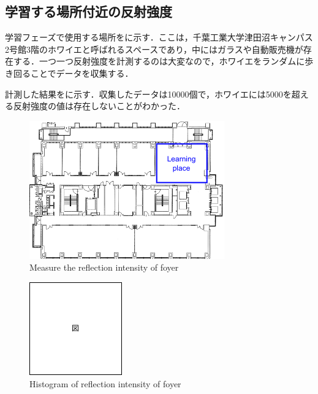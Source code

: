 \newpage

\subsection{学習する場所付近の反射強度}

  学習フェーズで使用する場所をに示す．ここは，千葉工業大学津田沼キャンパス2号館3階のホワイエと呼ばれるスペースであり，中にはガラスや自動販売機が存在する．一つ一つ反射強度を計測するのは大変なので，ホワイエをランダムに歩き回ることでデータを収集する．

  計測した結果をに示す．収集したデータは10000個で，ホワイエには5000を超える反射強度の値は存在しないことがわかった．

  \begin{figure}[h]
    \centering
    \includegraphics[keepaspectratio, scale=0.70] {images/RobotGuidance_exp3_foyer.png}
    \captionsetup{justification=raggedright} %
    \caption{Measure the reflection intensity of foyer}
    \label{Fig:RobotGuidance_exp3_foyer}
  \end{figure}

  \begin{figure}[h]
    \centering
    \includegraphics[keepaspectratio, scale=0.80] {images/figure.png}
    \captionsetup{justification=raggedright} %
    \caption{Histogram of reflection intensity of foyer}
    \label{Fig:Histogram of reflection intensity of foyer}
  \end{figure}

